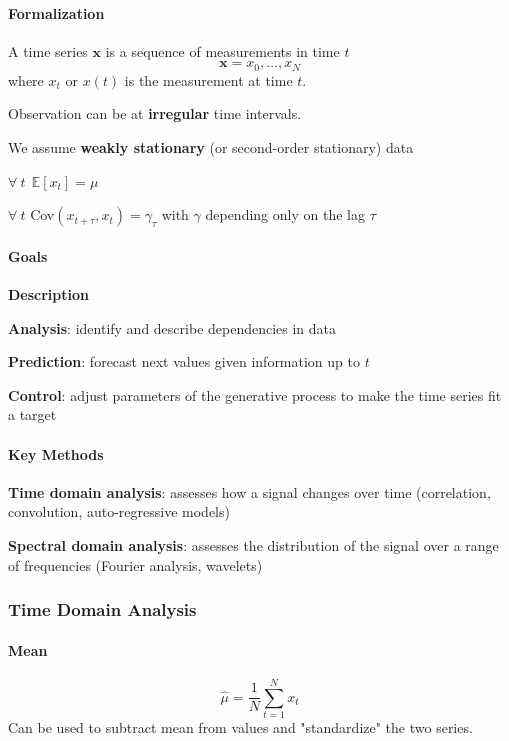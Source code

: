 \documentclass[10pt]{report}
\begin{document}
\paragraph{Formalization} A time series $\mathbf{x}$ is a sequence of measurements in time $t$
$$\mathbf{x} = x_0,\ldots,x_N$$
where $x_t$ or $x(t)$ is the measurement at time $t$.
\begin{list}{}{}
	\item Observation can be at \textbf{irregular} time intervals.
	\item We assume \textbf{weakly stationary} (or second-order stationary) data\begin{list}{}{}
		\item $\forall\:t\:\:\mathbb{E}[x_t] = \mu$
		\item $\forall\:t$ Cov$(x_{t+\tau},x_t) = \gamma_\tau$ with $\gamma$ depending only on the lag $\tau$
	\end{list}
\end{list}
\paragraph{Goals}\begin{list}{}{}
	\item \textbf{Description}
	\item \textbf{Analysis}: identify and describe dependencies in data
	\item \textbf{Prediction}: forecast next values given information up to $t$
	\item \textbf{Control}: adjust parameters of the generative process to make the time series fit a target
\end{list}
\paragraph{Key Methods}\begin{list}{}{}
	\item \textbf{Time domain analysis}: assesses how a signal changes over time (correlation, convolution, auto-regressive models)
	\item \textbf{Spectral domain analysis}: assesses the distribution of the signal over a range of frequencies (Fourier analysis, wavelets)
\end{list}
\subsubsection{Time Domain Analysis}
\paragraph{Mean} $$\hat\mu=\frac{1}{N}\sum_{t=1}^N x_t$$
Can be used to subtract mean from values and "standardize" the two series.
\end{document}
